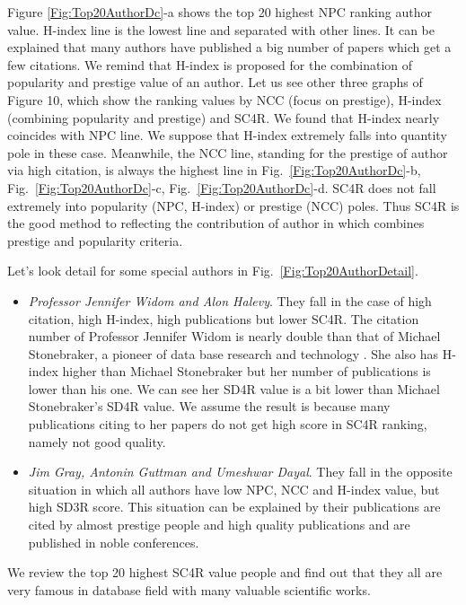 \documentclass[10pt,leqno,twoside]{article}
\begin{document}
Figure \ref{Fig:Top20AuthorDc}-a shows the top 20 highest NPC ranking author value.  H-index line is the lowest line and separated with other lines. It can be explained that  many authors have published a big number of papers which get a few citations. We remind that H-index is proposed for the combination of popularity and prestige value of an author. Let us see other three graphs of Figure 10, which show the ranking values by NCC (focus on prestige), H-index (combining popularity and prestige) and SC4R. We found that H-index nearly coincides with NPC line. We suppose that H-index extremely falls into quantity pole in these case. Meanwhile, the NCC line, standing for the prestige of author via high citation, is always the highest line in Fig.~\ref{Fig:Top20AuthorDc}-b, Fig.~\ref{Fig:Top20AuthorDc}-c, Fig.~\ref{Fig:Top20AuthorDc}-d. SC4R does not fall extremely into popularity (NPC, H-index) or prestige (NCC) poles. Thus SC4R is the good method to reflecting the contribution of author in which combines prestige and popularity criteria.

Let's look detail for some special authors in Fig.~\ref{Fig:Top20AuthorDetail}.

\begin{itemize}
\item \textit{Professor Jennifer Widom and Alon Halevy}. They fall in the case of high citation, high H-index, high publications but lower SC4R.
The citation number of Professor Jennifer Widom
is nearly double than that of Michael Stonebraker, a pioneer of data base research and technology %
. She also has H-index higher than Michael Stonebraker
but her number of publications is lower than his one. We can see her SD4R value is a bit lower than Michael Stonebraker's SD4R value. We assume the result is because many publications citing to her papers do not get high score in SC4R ranking, namely not good quality.
\item \textit{Jim Gray, Antonin Guttman and Umeshwar Dayal}. They fall in the opposite situation in which all authors have low NPC, NCC and H-index value, but high SD3R score. This situation can be explained by their publications are cited by almost prestige people and high quality publications and are published in noble conferences.
\end{itemize}

We review the top 20 highest SC4R value people and find out that they all are very famous in database field with many valuable scientific works.
\end{document}
